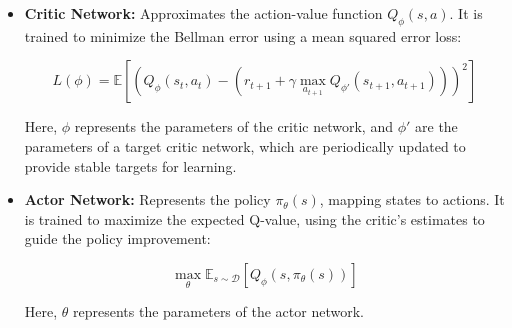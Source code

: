 \begin{itemize}
	\item \textbf{Critic Network:} Approximates the action-value function \( Q_{\phi}(s, a) \). It is trained to minimize the Bellman error using a mean squared error loss:
	
	\[
	L(\phi) = \mathbb{E}\left[\left(Q_{\phi}(s_t, a_t) - \left(r_{t+1} + \gamma \max_{a_{t+1}} Q_{\phi'}(s_{t+1}, a_{t+1})\right)\right)^2\right]
	\]
	
	Here, \( \phi \) represents the parameters of the critic network, and \( \phi' \) are the parameters of a target critic network, which are periodically updated to provide stable targets for learning.
	
	\item \textbf{Actor Network:} Represents the policy \( \pi_{\theta}(s) \), mapping states to actions. It is trained to maximize the expected Q-value, using the critic's estimates to guide the policy improvement:
	
	\[
	\max_{\theta} \mathbb{E}_{s \sim \mathcal{D}}\left[Q_{\phi}(s, \pi_{\theta}(s))\right]
	\]
	
	Here, \( \theta \) represents the parameters of the actor network.
\end{itemize}


